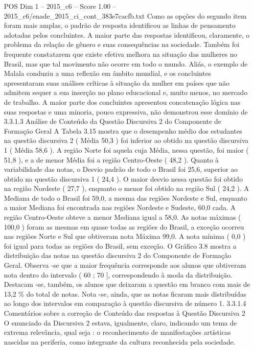 \begin{textsample}{POS Dim 1 – 2015\_c6 – Score 1.00 – 2015\_c6/enade\_2015\_ci\_cont\_383e7cacfb.txt}
Como as opções do segundo item foram mais amplas, o padrão de resposta identificou as linhas de pensamento adotadas pelos concluintes.
A maior parte das respostas identificou, claramente, o problema da relação de gênero e suas consequências na sociedade.
Também foi frequente constatarem que existe efetiva melhora na situação das mulheres no Brasil, mas que tal movimento não ocorre em todo o mundo.
Aliás, o exemplo de Malala conduziu a uma reflexão em âmbito mundial, e os concluintes apresentaram suas análises críticas à situação da mulher em países que não admitem sequer a sua inserção no plano educacional e, muito menos, no mercado de trabalho.
A maior parte dos concluintes apresentou concatenação lógica nas suas respostas e uma minoria, pouco expressiva, não demonstrou esse domínio de 3.3.1.3 Análise de Conteúdo da Questão Discursiva 2 do Componente de Formação Geral A Tabela 3.15 mostra que o desempenho médio dos estudantes na questão discursiva 2 ( Média 50,3 ) foi inferior ao obtido na questão discursiva 1 ( Média 58,6 ).
A região Norte foi aquela cuja Média, nessa questão, foi maior ( 51,8 ), e a de menor Média foi a região Centro-Oeste ( 48,2 ).
Quanto à variabilidade das notas, o Desvio padrão de todo o Brasil foi 25,6, superior ao obtido na questão discursiva 1 ( 24,4 ).
O maior desvio nessa questão foi obtido na região Nordeste ( 27,7 ), enquanto o menor foi obtido na região Sul ( 24,2 ).
A Mediana de todo o Brasil foi 59,0, a mesma das regiões Nordeste e Sul, enquanto a maior Mediana foi encontrada nas regiões Nordeste e Sudeste, 60,0 cada.
A região Centro-Oeste obteve a menor Mediana igual a 58,0.
As notas máximas ( 100,0 ) foram as mesmas em quase todas as regiões do Brasil, a exceção ocorreu nas regiões Norte e Sul que obtiveram nota Máxima 99,0.
A nota mínima ( 0,0 ) foi igual para todas as regiões do Brasil, sem exceção.
O Gráfico 3.8 mostra a distribuição das notas na questão discursiva 2 do Componente de Formação Geral.
Observa -se que a maior frequência corresponde aos alunos que obtiveram nota dentro do intervalo ( 60 ; 70 ], correspondendo à moda da distribuição.
Destacam -se, também, os alunos que deixaram a questão em branco com mais de 13,2 \% do total de notas.
Nota -se, ainda, que as notas ficaram mais distribuídas ao longo dos intervalos em comparação à questão discursiva de número 1. 3.3.1.4 Comentários sobre a correção de Conteúdo das respostas à Questão Discursiva 2 O enunciado da Discursiva 2 estava, igualmente, claro, indicando um tema de extrema relevância, qual seja : o reconhecimento de manifestações artísticas nascidas na periferia, como integrante da cultura reconhecida pela sociedade.

\end{textsample}
